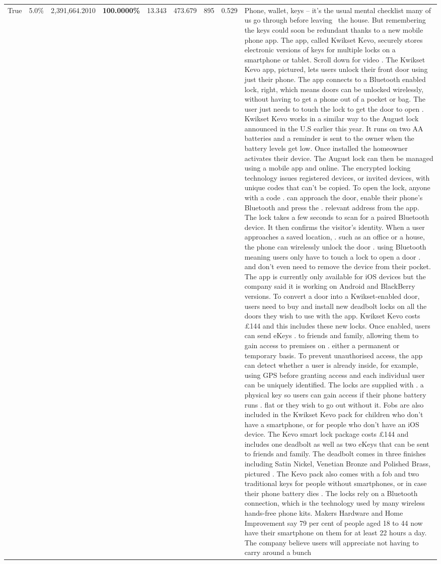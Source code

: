 \begin{table}[H]
\begin{tabular}{lllrlllll}
True & 5.0\% & 2,391,664.2010 & \bfseries \color{red} 100.0000\% & 13.343 & 473.679 & 895 & 0.529 & Phone, wallet, keys – it’s the usual mental checklist many of us go through before leaving  the house. But remembering the keys could soon be redundant thanks to a new mobile phone app. The app, called Kwikset Kevo, securely stores electronic versions of keys for multiple locks on a smartphone or tablet. Scroll down for video . The Kwikset Kevo app, pictured, lets users unlock their front door using just their phone. The app connects to a Bluetooth enabled lock, right, which means doors can be unlocked wirelessly, without having to get a phone out of a pocket or bag. The user just needs to touch the lock to get the door to open . Kwikset Kevo works in a similar way to the August lock announced in the U.S earlier this year. It runs on two AA batteries and a reminder is sent to the owner when the battery levels get low. Once installed the homeowner activates their device. The August lock can then be managed using a mobile app and online. The encrypted locking technology issues registered devices, or invited devices, with unique codes that can't be copied. To open the lock, anyone with a code . can approach the door, enable their phone's Bluetooth and press the . relevant address from the app. The lock takes a few seconds to scan for a paired Bluetooth device. It then confirms the visitor's identity. When a user approaches a saved location, . such as an office or a house, the phone can wirelessly unlock the door . using Bluetooth meaning users only have to touch a lock to open a door . and don't even need to remove the device from their pocket. The app is currently only available for iOS devices but the company said it is working on Android and BlackBerry versions. To convert a door into a Kwikset-enabled door, users need to buy and install new deadbolt locks on all the doors they wish to use with the app. Kwikset Kevo costs £144 and this includes these new locks. Once enabled, users can send eKeys . to friends and family, allowing them to gain access to premises on . either a permanent or temporary basis. To prevent unauthorised access, the app can detect whether a user is already inside, for example, using GPS before granting access and each individual user can be uniquely identified. The locks are supplied with . a physical key so users can gain access if their phone battery runs . flat or they wish to go out without it. Fobs are also included in the Kwikset Kevo pack for children who don't have a smartphone, or for people who don't have an iOS device. The Kevo smart lock package costs £144 and includes one deadbolt as well as two eKeys that can be sent to friends and family. The deadbolt comes in three finishes including Satin Nickel, Venetian Bronze and Polished Brass, pictured . The Kevo pack also comes with a fob and two traditional keys for people without smartphones, or in case their phone battery dies . The locks rely on a Bluetooth connection, which is the technology used by many wireless hands-free phone kits. Makers Hardware and Home Improvement say 79 per cent of people aged 18 to 44 now have their smartphone on them for at least 22 hours a day. The company believe users will appreciate not having to carry around a bunch 
\end{tabular}
\end{table}
